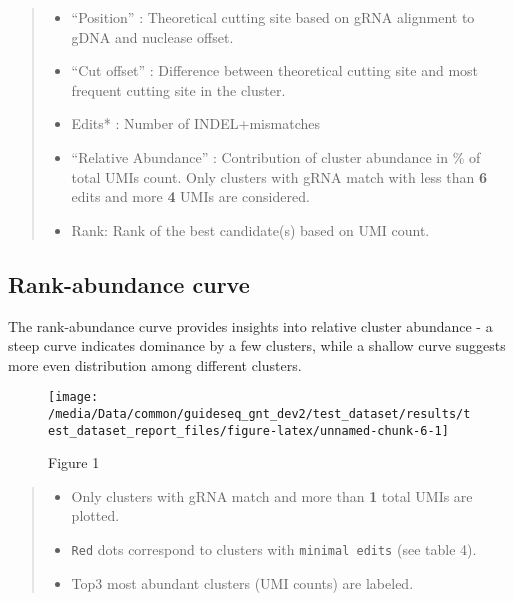 \documentclass[
]{article}
\begin{document}
\begin{quote}
\begin{itemize}
\item
  ``Position'' : Theoretical cutting site based on gRNA alignment to
  gDNA and nuclease offset.
\item
  ``Cut offset'' : Difference between theoretical cutting site and most
  frequent cutting site in the cluster.
\item
  Edits* : Number of INDEL+mismatches
\item
  ``Relative Abundance'' : Contribution of cluster abundance in \% of
  total UMIs count. Only clusters with gRNA match with less than
  \textbf{6} edits and more \textbf{4} UMIs are considered.
\item
  Rank: Rank of the best candidate(s) based on UMI count.
\end{itemize}
\end{quote}

\subsection{Rank-abundance curve}\label{rank-abundance-curve}

The rank-abundance curve provides insights into relative cluster
abundance - a steep curve indicates dominance by a few clusters, while a
shallow curve suggests more even distribution among different clusters.

\begin{figure}[H]

{\centering \texttt{[image: /media/Data/common/guideseq\_gnt\_dev2/test\_dataset/results/test\_dataset\_report\_files/figure-latex/unnamed-chunk-6-1]} 

}

\caption{Figure 1}\label{fig:unnamed-chunk-6}
\end{figure}

\begin{quote}
\begin{itemize}
\item
  Only clusters with gRNA match and more than \textbf{1} total UMIs are
  plotted.
\item
  \texttt{Red} dots correspond to clusters with \texttt{minimal\ edits}
  (see table 4).
\item
  Top3 most abundant clusters (UMI counts) are labeled.
\end{itemize}
\end{quote}
\end{document}
